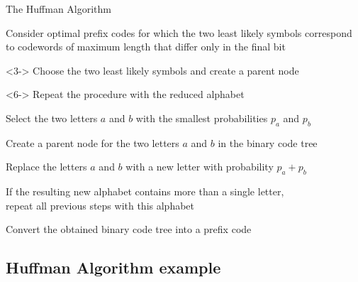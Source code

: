 \begin{frame}{The Huffman Algorithm}
\begin{minipage}[t]{0.8\linewidth}
  \bit\small%
  \item Consider optimal prefix codes for which the two least likely symbols correspond to codewords of maximum length that differ only in the final bit
  \item[\iarrow]<3-> Choose the two least likely symbols and create a parent node 
  \item[\iarrow]<6-> Repeat the procedure with the reduced alphabet
 \eit
\end{minipage}%

  \vspace{-2.0ex}
  \begin{center}
    \begin{minipage}{0.8\linewidth}
      \ben\small
    \item\vspace{.3ex} Select the two letters $a$ and $b$ with the smallest probabilities $p_a$ and $p_b$
    \item\vspace{.3ex} Create a parent node for the two letters $a$ and $b$ in the binary code tree
    \item\vspace{.3ex} Replace the letters $a$ and $b$ with a new letter with probability $p_a+p_b$
    \item\vspace{.3ex} If the resulting new alphabet contains more than a single letter,\\
      repeat all previous steps with this alphabet
    \item\vspace{.3ex} Convert the obtained binary code tree into a prefix code
      \een
      \eablk
    \end{minipage}
  \end{center}
  \vspace{-10ex}
\end{frame}


\subsection{Huffman Algorithm example}



